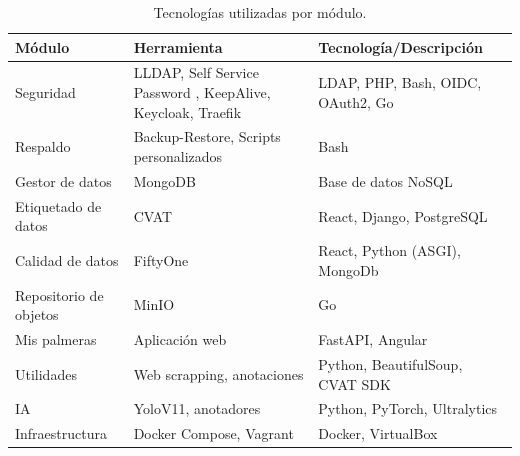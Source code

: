\begin{table}[H]
  \centering
  \caption[Tecnologías utilizadas]{Tecnologías utilizadas por módulo.}
  \begin{tabularx}{\textwidth}{ >{\raggedright\arraybackslash}p{2.5cm} >{\raggedright\arraybackslash}X >{\raggedright\arraybackslash}X }
    \toprule
    \textbf{Módulo}        & \textbf{Herramienta}                                                                       & \textbf{Tecnología/Descripción}                      \\
    \midrule
    Seguridad              & LLDAP, Self Service Password \citep{ltb_project_ldap_nodate}, KeepAlive, Keycloak, Traefik & LDAP, PHP, Bash, OIDC, OAuth2, Go                    \\
    Respaldo               & Backup-Restore, Scripts personalizados                                                     & Bash                                                 \\
    Gestor de datos        & MongoDB                                                                                    & Base de datos NoSQL                                  \\
    Etiquetado de datos    & CVAT                                                                                       & React, Django, PostgreSQL                            \\
    Calidad de datos       & FiftyOne                                                                                   & React, Python (ASGI), MongoDb                        \\
    Repositorio de objetos & MinIO                                                                                      & Go                                                   \\
    Mis palmeras           & Aplicación web                                                                             & FastAPI, Angular                                     \\
    Utilidades             & Web scrapping, anotaciones                                                                 & Python, BeautifulSoup, CVAT SDK                      \\
    IA                     & YoloV11, anotadores                                                                        & Python, PyTorch, Ultralytics                         \\
    Infraestructura        & Docker Compose, Vagrant                                                                    & Docker, VirtualBox \citep{wikipedia_virtualbox_2025} \\
    \bottomrule
    \hline
  \end{tabularx}
  \label{tab:tecnologias}
\end{table}


